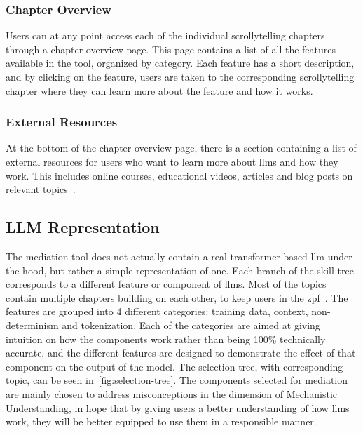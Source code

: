 \subsubsection*{Chapter Overview}
Users can at any point access each of the individual scrollytelling chapters through a chapter overview page. This page contains a list of all the features available in the tool, organized by category. Each feature has a short description, and by clicking on the feature, users are taken to the corresponding scrollytelling chapter where they can learn more about the feature and how it works.

\subsubsection*{External Resources}
At the bottom of the chapter overview page, there is a section containing a list of external resources for users who want to learn more about \gls{llms} and how they work. This includes online courses, educational videos, articles and blog posts on relevant topics~\cite{bergstrom_west_bullshit_machines,cho_transformer_explainer_2024,google_pair_explorables,perret_not_writing_chatgpt_2024,sanderson_llm_explained_video,savetheai_website,stollnitz_gpt_works_2023}.

\subsection{LLM Representation}
The mediation tool does not actually contain a real transformer-based \gls{llm} under the hood, but rather a simple representation of one. Each branch of the skill tree corresponds to a different feature or component of \gls{llms}. Most of the topics contain multiple chapters building on each other, to keep users in the \gls{zpf}~\cite{basawapatna_zones_2013}. The features are grouped into 4 different categories: training data, context, non-determinism and tokenization. Each of the categories are aimed at giving intuition on how the components work rather than being 100\% technically accurate, and the different features are designed to demonstrate the effect of that component on the output of the model. The selection tree, with corresponding topic, can be seen in~\autoref{fig:selection-tree}. 
The components selected for mediation are mainly chosen to address misconceptions in the dimension of Mechanistic Understanding, in hope that by giving users a better understanding of how \gls{llms} work, they will be better equipped to use them in a responsible manner.


